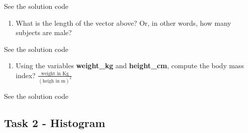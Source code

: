 \documentclass[
]{book}
\newenvironment{Shaded}{\begin{snugshade}}{\end{snugshade}}
\newcommand{\CommentTok}[1]{\textcolor[rgb]{0.56,0.35,0.01}{\textit{#1}}}
\newcommand{\DecValTok}[1]{\textcolor[rgb]{0.00,0.00,0.81}{#1}}
\newcommand{\FunctionTok}[1]{\textcolor[rgb]{0.13,0.29,0.53}{\textbf{#1}}}
\newcommand{\NormalTok}[1]{#1}
\newcommand{\OtherTok}[1]{\textcolor[rgb]{0.56,0.35,0.01}{#1}}
\newcommand{\SpecialCharTok}[1]{\textcolor[rgb]{0.81,0.36,0.00}{\textbf{#1}}}
\newcommand{\StringTok}[1]{\textcolor[rgb]{0.31,0.60,0.02}{#1}}
\providecommand{\tightlist}{%
  \setlength{\itemsep}{0pt}\setlength{\parskip}{0pt}}
\begin{document}
See the solution code

\begin{Shaded}
\end{Shaded}

\begin{enumerate}
\def\labelenumi{\arabic{enumi})}
\setcounter{enumi}{1}
\tightlist
\item
  What is the length of the vector above? Or, in other words, how many subjects
  are male?
\end{enumerate}

See the solution code

\begin{Shaded}
\end{Shaded}

\begin{enumerate}
\def\labelenumi{\arabic{enumi})}
\setcounter{enumi}{2}
\tightlist
\item
  Using the variables \textbf{weight\_kg} and \textbf{height\_cm}, compute the body mass
  index?
  \(\frac{\text{weight in Kg}}{(\text{heigh in m})^2}\)
\end{enumerate}

See the solution code

\begin{Shaded}
\end{Shaded}

\subsection*{Task 2 - Histogram}\label{task-2---histogram}
\end{document}

